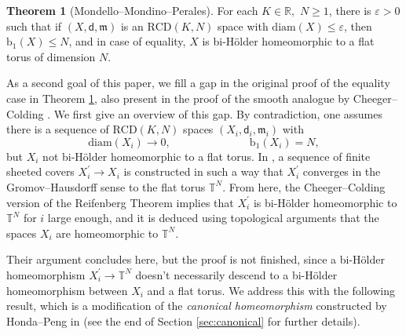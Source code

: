 \documentclass[12pt]{amsart}
\theoremstyle{definition}
\def\fnum{equation}
\newtheorem{theorem}[\fnum]{Theorem}
\newtheorem{mainthm}{Theorem}
\numberwithin{equation}{section}
\newcommand{\diam}{{\text {diam}}}
\newcommand{\bet}{\text{b}_1}
\newcommand{\iso}{\text{Iso}}
\newcommand{\rcd}{\text{RCD}}
\newcommand{\mm}{\mathfrak{m}}
\begin{document}
\begin{theorem}[Mondello--Mondino--Perales]\label{thm:mmp}
For each $K \in \mathbb{R},$ $N \geq 1 $, there is $\varepsilon > 0$ such that if $(X,\mathsf{d},  \mm ) $ is an $\rcd (K,N)$ space with $\diam (X) \leq \varepsilon $, then $\bet (X) \leq N $, and in case of equality, $X$ is  bi-H\"older homeomorphic to a flat torus of dimension $N$.
\end{theorem}

 As a second goal of this paper,  we fill a gap in the original proof of the equality case in Theorem \ref{thm:mmp}, also present in the proof of the smooth analogue  by Cheeger--Colding \cite[Theorem A.1.13]{cheeger-colding-i}. We  first give an overview of this gap. By contradiction, one assumes there is a sequence of $\rcd (K,N)$ spaces $(X_i, \mathsf{d}_i, \mm_i)$ with 
\[ \diam (X_i) \to 0,  \hspace{3cm}  \bet (X_i) = N , \]
but $X_i$ not bi-H\"older homeomorphic to a flat torus. In \cite{mondello-mondino-perales}, a sequence of finite sheeted covers $X_i^{\prime} \to X_i$ is constructed in such a way that $X_i^{\prime}$ converges in the Gromov--Hausdorff sense to the flat torus $ \mathbb{T}^N$. From here, the Cheeger--Colding version of the Reifenberg Theorem  \cite[Appendix A]{cheeger-colding-i} implies that $X_i^{\prime}$ is bi-H\"older homeomorphic to $\mathbb{T}^N$ for $i$ large enough, and it is deduced using topological arguments that the spaces $X_i$ are homeomorphic to $\mathbb{T}^N$. 


Their argument concludes here, but the proof is not finished, since a bi-H\"older homeomorphism $ X_i^{\prime} \to \mathbb{T}^N$ doesn't necessarily descend to a bi-H\"older homeomorphism between $X_i$ and a flat torus. We address this with the following result, which is a modification of the \emph{canonical homeomorphism} constructed by Honda--Peng in \cite[Theorem 6.3]{honda-peng} (see the end of Section \ref{sec:canonical} for further details). 

\end{document}
